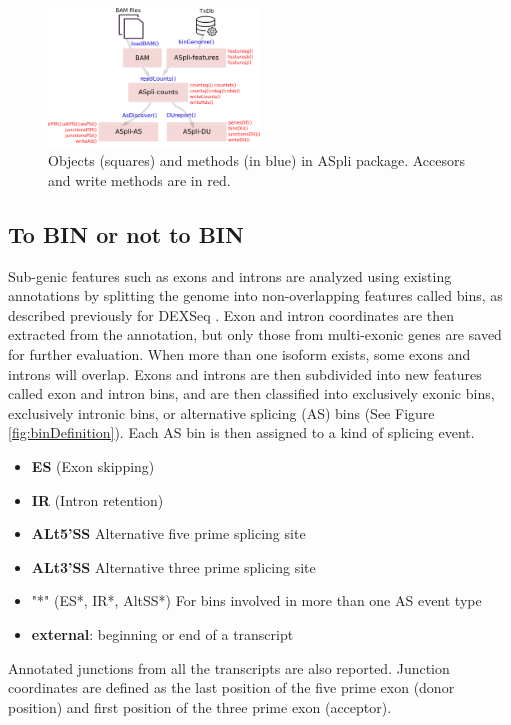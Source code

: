 \documentclass{article}
\begin{document}
\begin{figure}[ht!]
\centering
\includegraphics[width=0.5\textwidth]{wf.png}
\caption{Objects (squares) and methods (in blue) in ASpli package.  
  Accesors and write methods are in red. }
\label{fig:ASpliStructure}
\end{figure}

\subsection{ To BIN or not to BIN } %
Sub-genic features such as exons and introns are analyzed using existing
annotations by splitting the genome into non-overlapping features called bins, 
as described previously for DEXSeq \cite{pmid22722343}. Exon and intron 
coordinates are then extracted from the annotation, but only those from 
multi-exonic genes are saved for further evaluation. When more than one isoform 
exists, some exons and introns will overlap. Exons and introns are then 
subdivided into new features called exon and intron bins, and are then 
classified into exclusively exonic bins, exclusively intronic bins, or 
alternative splicing (AS) bins (See Figure \ref{fig:binDefinition}). Each AS bin
is then assigned to a kind of splicing event. 

\begin{itemize}
\item \textbf {ES} (Exon skipping)
\item \textbf {IR} (Intron retention)
\item \textbf {ALt5'SS} Alternative five prime splicing site
\item \textbf {ALt3'SS} Alternative three prime splicing site
\item "*" (ES*, IR*, AltSS*) For bins involved in more than one AS event type
\item \textbf {external}: beginning or end of a transcript
\end{itemize}

Annotated junctions from all the transcripts are also reported. Junction 
coordinates are defined as the last position of the five prime exon (donor 
position) and first position of the three prime exon (acceptor).
\end{document}
